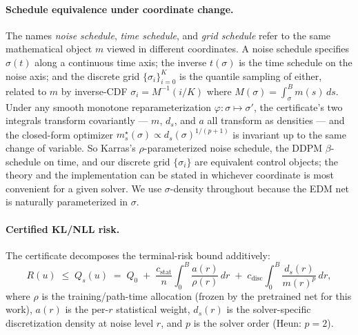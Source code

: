 \documentclass[11pt]{article}
\begin{document}
\paragraph{Schedule equivalence under coordinate change.} The names
\emph{noise schedule}, \emph{time schedule}, and \emph{grid schedule}
refer to the same mathematical object \(m\) viewed in different
coordinates. A noise schedule specifies \(\sigma(t)\) along a continuous
time axis; the inverse \(t(\sigma)\) is the time schedule on the noise
axis; and the discrete grid \(\{\sigma_i\}_{i=0}^{K}\) is the
quantile sampling of either, related to \(m\) by inverse-CDF
\(\sigma_i = M^{-1}(i/K)\) where \(M(\sigma)=\int_\sigma^B m(s)\,ds\).
Under any smooth monotone reparameterization
\(\varphi:\sigma\mapsto\sigma'\), the certificate's two integrals
transform covariantly --- \(m\), \(d_s\), and \(a\) all transform as
densities --- and the closed-form optimizer
\(m^\star_s(\sigma)\propto d_s(\sigma)^{1/(p+1)}\) is invariant up to
the same change of variable. So Karras's \(\rho\)-parameterized noise
schedule, the DDPM \(\beta\)-schedule on time, and our discrete grid
\(\{\sigma_i\}\) are equivalent control objects; the theory and the
implementation can be stated in whichever coordinate is most
convenient for a given solver. We use \(\sigma\)-density throughout
because the EDM net is naturally parameterized in \(\sigma\).

\paragraph{Certified KL/NLL risk.} The certificate decomposes the
terminal-risk bound additively:
\[
R(u) \;\le\; Q_s(u) \;=\; Q_0
\;+\;
\frac{c_{\mathrm{stat}}}{n}\!\int_0^{B}\!\frac{a(r)}{\rho(r)}\,dr
\;+\;
c_{\mathrm{disc}}\!\int_0^{B}\!\frac{d_s(r)}{m(r)^p}\,dr,
\]
where \(\rho\) is the training/path-time allocation (frozen by the
pretrained net for this work), \(a(r)\) is the per-\(r\) statistical
weight, \(d_s(r)\) is the solver-specific discretization density at noise
level \(r\), and \(p\) is the solver order (Heun: \(p=2\)).
\end{document}
